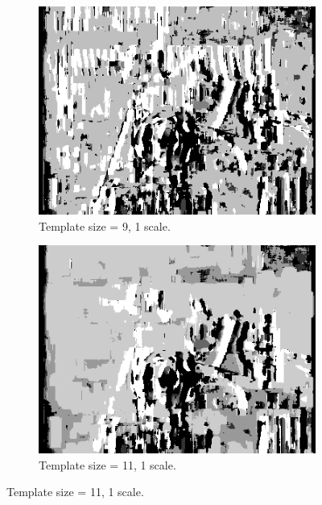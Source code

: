 \documentclass[12pt,a4paper,oneside,final]{article}
\begin{document}
\begin{figure}[H]
\begin{subfigure}[b]{0.24\textwidth}
	\includegraphics[width=\textwidth]{disparity_s1_k9.png}
	\caption{Template size = 9, 1 scale.}
\end{subfigure}
\begin{subfigure}[b]{0.24\textwidth}
	\includegraphics[width=\textwidth]{disparity_s1_k11.png}
	\caption{Template size = 11, 1 scale.}
\end{subfigure}
\end{figure}
\end{document}
